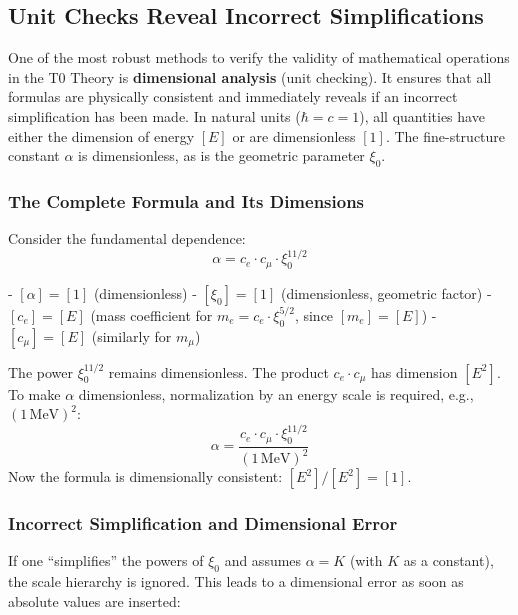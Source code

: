 \documentclass[12pt,a4paper]{article}
\newcommand{\xipar}{\xi_0}
\begin{document}
	\subsection{Unit Checks Reveal Incorrect Simplifications}
	
	One of the most robust methods to verify the validity of mathematical operations in the T0 Theory is \textbf{dimensional analysis} (unit checking). It ensures that all formulas are physically consistent and immediately reveals if an incorrect simplification has been made. In natural units ($\hbar = c = 1$), all quantities have either the dimension of energy $[E]$ or are dimensionless $[1]$. The fine-structure constant $\alpha$ is dimensionless, as is the geometric parameter $\xipar$.
	
	\subsubsection{The Complete Formula and Its Dimensions}
	
	Consider the fundamental dependence:
	\begin{equation}
		\alpha = c_e \cdot c_\mu \cdot \xipar^{11/2}
		\label{eq:full_with_dims}
	\end{equation}
	
	- $[\alpha] = [1]$ (dimensionless)
	- $[\xipar] = [1]$ (dimensionless, geometric factor)
	- $[c_e] = [E]$ (mass coefficient for $m_e = c_e \cdot \xipar^{5/2}$, since $[m_e] = [E]$)
	- $[c_\mu] = [E]$ (similarly for $m_\mu$)
	
	The power $\xipar^{11/2}$ remains dimensionless. The product $c_e \cdot c_\mu$ has dimension $[E^2]$. To make $\alpha$ dimensionless, normalization by an energy scale is required, e.g., $(1\,\text{MeV})^2$:
	\begin{equation}
		\alpha = \frac{c_e \cdot c_\mu \cdot \xipar^{11/2}}{(1\,\text{MeV})^2}
	\end{equation}
	Now the formula is dimensionally consistent: $[E^2] / [E^2] = [1]$.
	
	\subsubsection{Incorrect Simplification and Dimensional Error}
	
	If one ``simplifies'' the powers of $\xipar$ and assumes $\alpha = K$ (with $K$ as a constant), the scale hierarchy is ignored. This leads to a dimensional error as soon as absolute values are inserted:
	
\end{document}
